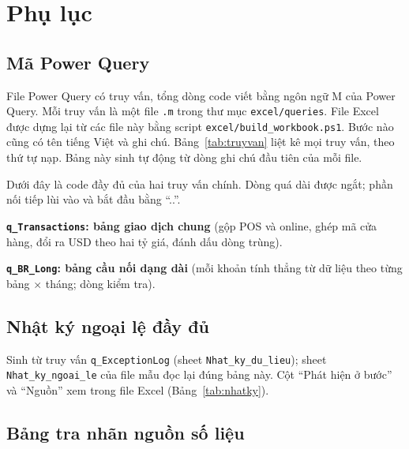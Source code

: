 \section*{Phụ lục}
\renewcommand{\thesubsection}{\Alph{subsection}.}
\setcounter{subsection}{0}

\subsection{Mã Power Query}

File Power Query có \SoTruyVan{} truy vấn, tổng \SoDongMa{} dòng code viết bằng ngôn ngữ M của Power Query. Mỗi truy vấn là một file \texttt{.m} trong thư mục \texttt{excel/queries}. File Excel được dựng lại từ các file này bằng script \texttt{excel/build\_workbook.ps1}. Bước nào cũng có tên tiếng Việt và ghi chú. Bảng~\ref{tab:truyvan} liệt kê mọi truy vấn, theo thứ tự nạp. Bảng này sinh tự động từ dòng ghi chú đầu tiên của mỗi file.

\label{tab:truyvan}\nopagebreak[4]


Dưới đây là code đầy đủ của hai truy vấn chính. Dòng quá dài được ngắt; phần nối tiếp lùi vào và bắt đầu bằng ``..''.

\textbf{\texttt{q\_Transactions}: bảng giao dịch chung} (gộp POS và online, ghép mã cửa hàng, đổi ra USD theo hai tỷ giá, đánh dấu dòng trùng).
{\fontsize{6.5}{7.5}\selectfont{}}

\textbf{\texttt{q\_BR\_Long}: bảng cầu nối dạng dài} (mỗi khoản tính thẳng từ dữ liệu theo từng bảng $\times$ tháng; dòng kiểm tra).
{\fontsize{6.5}{7.5}\selectfont{}}

\subsection{Nhật ký ngoại lệ đầy đủ}
Sinh từ truy vấn \texttt{q\_ExceptionLog} (sheet \texttt{Nhat\_ky\_du\_lieu}); sheet \texttt{Nhat\_ky\_ngoai\_le} của file mẫu đọc lại đúng bảng này. Cột ``Phát hiện ở bước'' và ``Nguồn'' xem trong file Excel (Bảng~\ref{tab:nhatky}).

\label{tab:nhatky}\nopagebreak[4]


\subsection{Bảng tra nhãn nguồn số liệu}

